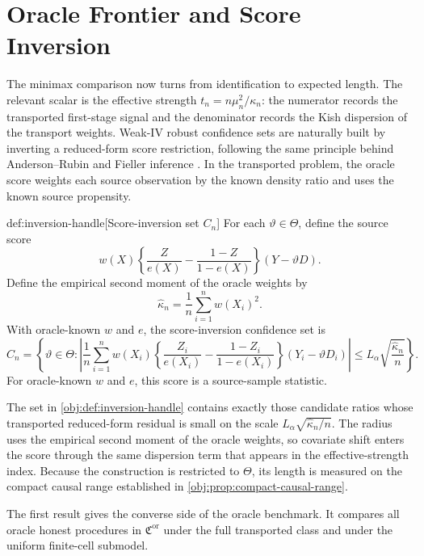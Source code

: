 \section{Oracle Frontier and Score Inversion}

The minimax comparison now turns from identification to expected length.  The relevant scalar is the effective strength \(t_n=n\mu_n^2/\kappa_n\): the numerator records the transported first-stage signal and the denominator records the Kish dispersion of the transport weights.  Weak-IV robust confidence sets are naturally built by inverting a reduced-form score restriction, following the same principle behind Anderson--Rubin and Fieller inference \citep{AndersonRubin1949,Fieller1954,StaigerStock1997,AndrewsStockSun2019}.  In the transported problem, the oracle score weights each source observation by the known density ratio and uses the known source propensity.

\begin{definitionv}{def:inversion-handle}[Score-inversion set $C_n$]
For each \(\vartheta\in\Theta\), define the source score
\[
w(X)\left\{\frac{Z}{e(X)}-\frac{1-Z}{1-e(X)}\right\}(Y-\vartheta D).
\]
Define the empirical second moment of the oracle weights by
\[
\widehat\kappa_n=\frac1n\sum_{i=1}^n w(X_i)^2.
\]
With oracle-known \(w\) and \(e\), the score-inversion confidence set is
\[
C_n
=
\left\{
\vartheta\in\Theta:
\left|
\frac1n\sum_{i=1}^n
w(X_i)\left\{\frac{Z_i}{e(X_i)}-\frac{1-Z_i}{1-e(X_i)}\right\}(Y_i-\vartheta D_i)
\right|
\le
L_\alpha\sqrt{\frac{\widehat\kappa_n}{n}}
\right\}.
\]
For oracle-known \(w\) and \(e\), this score is a source-sample statistic.
\end{definitionv}

The set in \cref{obj:def:inversion-handle} contains exactly those candidate ratios whose transported reduced-form residual is small on the scale \(L_\alpha\sqrt{\widehat\kappa_n/n}\).  The radius uses the empirical second moment of the oracle weights, so covariate shift enters the score through the same dispersion term that appears in the effective-strength index.  Because the construction is restricted to \(\Theta\), its length is measured on the compact causal range established in \cref{obj:prop:compact-causal-range}.

The first result gives the converse side of the oracle benchmark.  It compares all oracle honest procedures in \(\mathfrak C^{\mathrm{or}}\) under the full transported class and under the uniform finite-cell submodel.

